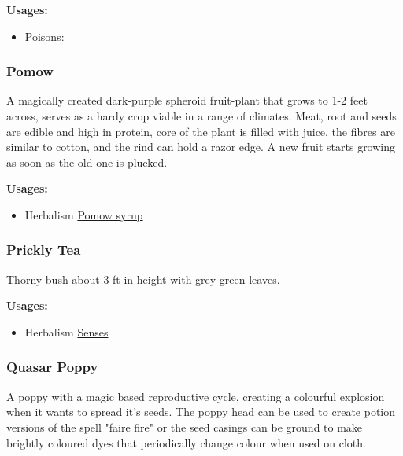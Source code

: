 \textbf{Usages:}

\begin{itemize}[noitemsep]
\item[] Poisons: \poison
\end{itemize}

\subsubsection{Pomow}
\label{Pomow}

A magically created dark-purple spheroid fruit-plant that grows to 1-2 feet across, serves as a hardy crop viable in a range of climates. Meat, root and seeds are edible and high in protein, core of the plant is filled with juice, the fibres are similar to cotton, and the rind can hold a razor edge. A new fruit starts growing as soon as the old one is plucked.

\vspace{5mm}

\textbf{Usages:}

\begin{itemize}[noitemsep]
\item[] Herbalism \hyperref[Pomow syrup]{Pomow syrup}
\end{itemize}

\subsubsection{Prickly Tea}
\label{Prickly Tea}

Thorny bush about 3 ft in height with grey-green leaves.

\vspace{5mm}

\textbf{Usages:}

\begin{itemize}[noitemsep]
\item[] Herbalism \hyperref[Senses]{Senses}
\end{itemize}

\subsubsection{Quasar Poppy}
\label{quasar_poppy}

A poppy with a magic based reproductive cycle, creating a colourful explosion when it wants to spread it's seeds. The poppy head can be used to create potion versions of the spell "faire fire" or the seed casings can be ground to make brightly coloured dyes that periodically change colour when used on cloth.

